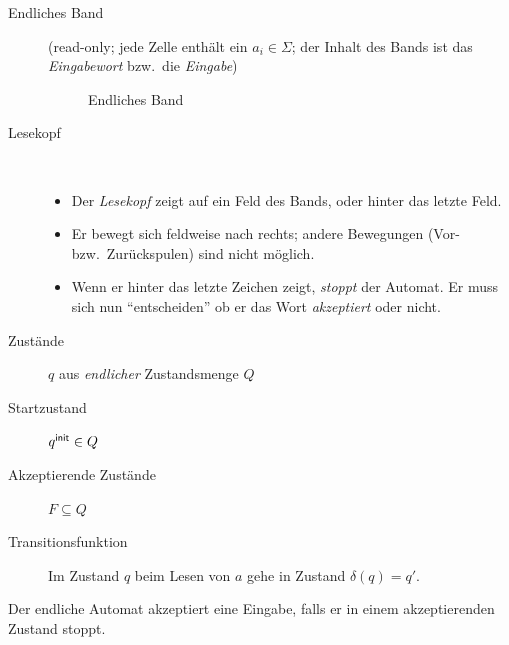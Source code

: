 \begin{description}
\item[Endliches Band] 
(read-only; jede Zelle enthält ein $a_i\in\Sigma$; der Inhalt des Bands ist das \emph{Eingabewort} bzw.\ die \emph{Eingabe})

\begin{figure}[H]\centering
        \caption{Endliches Band}
\end{figure}
\vspace{-1em}
\item[Lesekopf] ~\\
  \vspace{-\baselineskip}
  \begin{itemize}
        \item Der \emph{Lesekopf} zeigt auf ein Feld des Bands, oder hinter das letzte Feld.
        \item Er bewegt sich feldweise nach rechts; andere Bewegungen (Vor- bzw.\ Zurückspulen) sind nicht möglich.
        \item Wenn er hinter das letzte Zeichen zeigt, \emph{stoppt} der Automat.
    Er muss sich nun "`entscheiden"' ob er das Wort \emph{akzeptiert} oder nicht.
  \end{itemize}
\item[Zustände] $q$ aus \emph{endlicher} Zustandsmenge $Q$
\item[Startzustand] $q^\mathsf{init} \in Q$
\item[Akzeptierende Zustände] $F \subseteq Q$ 
\item[Transitionsfunktion] Im Zustand $q$ beim Lesen von $a$ gehe in Zustand $\delta(q) = q'$.
\end{description}
Der endliche Automat akzeptiert eine Eingabe, falls er in einem akzeptierenden Zustand stoppt.

